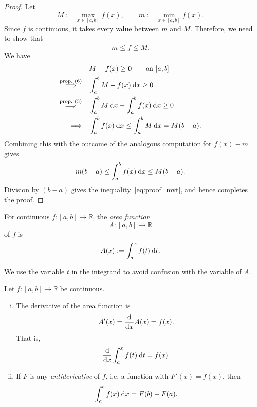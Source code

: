 \begin{proof}
Let
\[ M:=\max_{x\in[a,b]} f(x), \qquad m:=\min_{x\in[a,b]} f(x).\]
Since $f$ is continuous, it takes every value between $m$ and $M$. Therefore, we need to show that
\begin{equation}
\label{eq:proof_mvt}
 m \le \bar{f} \le M.
\end{equation}
We have
\begin{equation*}
\begin{split}
& M-f(x) \ge 0 \qquad \text{on~} [a,b] \\
\stackrel{\text{prop. (6)}}{\Longrightarrow} \quad & \int_{a}^{b} M-f(x) \: \mathrm{d} x \ge 0 \\
\stackrel{\text{prop. (3)}}{\Longrightarrow} \quad & \int_{a}^{b} M \: \mathrm{d} x-\int_{a}^{b} f(x) \: \mathrm{d} x \ge 0 \\
\Longrightarrow \quad & \int_{a}^{b} f(x) \: \mathrm{d} x \le \int_{a}^{b} M \: \mathrm{d} x = M(b-a).
\end{split}
\end{equation*}
Combining this with the outcome of the analogous computation for $f(x)-m$ gives
\[ m(b-a) \le \int_{a}^{b} f(x) \: \mathrm{d} x \le M(b-a). \]
Division by $(b-a)$ gives the inequality~\ref{eq:proof_mvt}, and hence completes the proof.
\end{proof}

\begin{definition}
For continuous $f:[a,b]\rightarrow\mathbb{R}$, the \emph{area function}
\[ A : [a,b] \rightarrow \mathbb{R} \]
of $f$ is
\[ A(x):=\int_{a}^{x} f(t) \: \mathrm{d} t. \]
\end{definition}

\begin{remark}
We use the variable $t$ in the integrand to avoid confusion with the variable of $A$.
\end{remark}

\begin{theorem}
Let $f:[a,b]\rightarrow\mathbb{R}$ be continuous.
\begin{enumerate}[(i)]
	\item The derivative of the area function is
	\[ A'(x) = \displaystyle{\frac{\mathrm{d}}{\mathrm{d}x}} A(x) = f(x).\]
	That is,
	\[ \displaystyle{\frac{\mathrm{d}}{\mathrm{d}x}} \int_{a}^{x} f(t) \: \mathrm{d} t = f(x). \]
	\item If $F$ is any \emph{antiderivative} of $f$, i.e. a function with $F'(x)=f(x)$, then
	\[ \int_{a}^{b} f(x) \: \mathrm{d} x = F(b) - F(a). \]
\end{enumerate}
\end{theorem}

